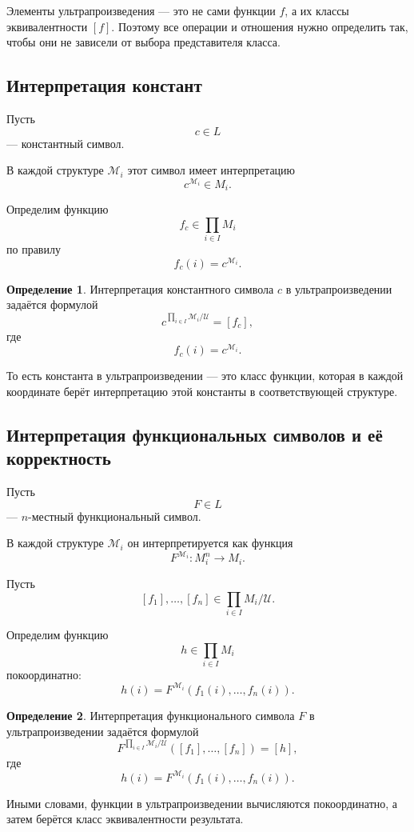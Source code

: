 \documentclass[12pt,a4paper,oneside,openany]{book}
\theoremstyle{definition}
\newtheorem{definition}{Определение}[chapter]
\theoremstyle{plain}
\theoremstyle{remark}
\begin{document}
Элементы ультрапроизведения — это не сами функции $f$, а их классы эквивалентности $[f]$. Поэтому все операции и отношения нужно определить так, чтобы они не зависели от выбора представителя класса.

\subsection{Интерпретация констант}

Пусть
\[
c\in L
\]
— константный символ.

В каждой структуре $\mathcal M_i$ этот символ имеет интерпретацию
\[
c^{\mathcal M_i}\in M_i.
\]

Определим функцию
\[
f_c\in\prod_{i\in I}M_i
\]
по правилу
\[
f_c(i)=c^{\mathcal M_i}.
\]

\begin{definition}
Интерпретация константного символа $c$ в ультрапроизведении задаётся формулой
\[
c^{\prod_{i\in I}\mathcal M_i/\mathcal U}
=
[f_c],
\]
где
\[
f_c(i)=c^{\mathcal M_i}.
\]
\end{definition}

То есть константа в ультрапроизведении — это класс функции, которая в каждой координате берёт интерпретацию этой константы в соответствующей структуре.

\subsection{Интерпретация функциональных символов и её корректность}

Пусть
\[
F\in L
\]
— $n$-местный функциональный символ.

В каждой структуре $\mathcal M_i$ он интерпретируется как функция
\[
F^{\mathcal M_i}:M_i^n\to M_i.
\]

Пусть
\[
[f_1],\ldots,[f_n]\in \prod_{i\in I}M_i/\mathcal U.
\]

Определим функцию
\[
h\in\prod_{i\in I}M_i
\]
покоординатно:
\[
h(i)
=
F^{\mathcal M_i}(f_1(i),\ldots,f_n(i)).
\]

\begin{definition}
Интерпретация функционального символа $F$ в ультрапроизведении задаётся формулой
\[
F^{\prod_{i\in I}\mathcal M_i/\mathcal U}
([f_1],\ldots,[f_n])
=
[h],
\]
где
\[
h(i)
=
F^{\mathcal M_i}(f_1(i),\ldots,f_n(i)).
\]
\end{definition}

Иными словами, функции в ультрапроизведении вычисляются покоординатно, а затем берётся класс эквивалентности результата.
\end{document}
